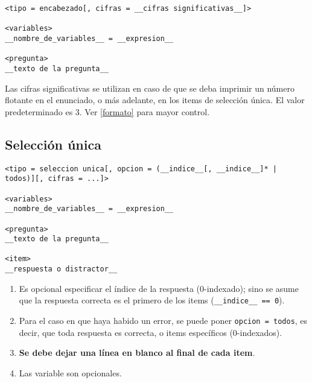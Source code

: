 \documentclass[12pt]{article}
\theoremstyle{definition}
\begin{document}
\small
\begin{verbatim}
<tipo = encabezado[, cifras = __cifras significativas__]>

<variables>
__nombre_de_variables__ = __expresion__

<pregunta>
__texto de la pregunta__
\end{verbatim}
\normalsize

Las cifras significativas se utilizan en caso de que se deba imprimir un número flotante en el enunciado, o más adelante, en los items de selección única. El valor predeterminado es 3. Ver \ref{formato} para mayor control.

\subsection{Selección única}

\small
\begin{verbatim}
<tipo = seleccion unica[, opcion = (__indice__[, __indice__]* | todos)][, cifras = ...]>

<variables>
__nombre_de_variables__ = __expresion__

<pregunta>
__texto de la pregunta__

<item>
__respuesta o distractor__

\end{verbatim}
\normalsize

\begin{enumerate}
  \item Es opcional especificar el índice de la respuesta (0-indexado); sino se asume que la respuesta correcta es el primero de los items (\verb|__indice__ == 0|).
  \item Para el caso en que haya habido un error, se puede poner \verb|opcion = todos|, es decir, que toda respuesta es correcta, o items específicos (0-indexados).
  \item \textbf{Se debe dejar una línea en blanco al final de cada item}.
  \item Las variable son opcionales.
\end{enumerate}


\end{document}

